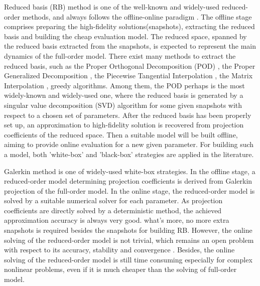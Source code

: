 \documentclass[preprint, 10pt]{elsarticle}
\begin{document}
Reduced basis (RB) method is one of the well-known and widely-used reduced-order methods, and always follows the offline-online paradigm \cite{maday2006reduced}. The offline stage comprises preparing the high-fidelity solutions(snapshots), extracting the reduced basis and building the cheap evaluation model. The reduced space, spanned by the reduced basis  extracted from the snapshots, is expected to represent the main dynamics of the full-order model. There exist many methods to extract the reduced basis, such as the Proper Orthogonal Decomposition (POD) \cite{hesthaven2016certified,liang2002proper,quarteroni2015reduced}, the  Proper Generalized Decomposition \cite{chinesta2011short}, the Piecewise Tangential Interpolation \cite{gallivan2002model}, the Matrix Interpolation \cite{panzer2010parametric}, greedy algorithms\cite{billaud2017dynamical, lappano2016greedy, hesthaven2014efficient}. Among them, the POD perhaps is the most widely-known and widely-used one, where the reduced basis is generated by a singular value decomposition (SVD) algorithm for some given snapshots with respect to a chosen set of parameters. After the reduced basis has been properly set up, an approximation to high-fidelity solution is recovered from projection coefficients of the reduced space. Then a suitable model will be built offline, aiming to provide online evaluation for a new given parameter.
For building such a model, both 'white-box' and 'black-box' strategies are applied in the literature.

Galerkin method \cite{rowley2004model, wang2020recurrent, deane1991low} is one of widely-used white-box strategies. In the offline stage,
a reduced-order model determining projection coefficients is derived from Galerkin projection of the full-order model. In the online stage, the reduced-order model is solved by a suitable numerical solver for each parameter.
As projection coefficients are directly solved by a deterministic method, the achieved approximation accuracy is always very good. what's more, no more extra snapshots is required besides the snapshots for building RB.
However, the online solving of the reduced-order model is not trivial, which remains an open problem with respect to its accuracy, stability and convergence \cite{huang2018challenges, iollo2000stability, rowley2004model}. Besides, the online solving of the reduced-order model is still time consuming especially for complex nonlinear problems, even if it is much cheaper than the solving of full-order model.

\end{document}
